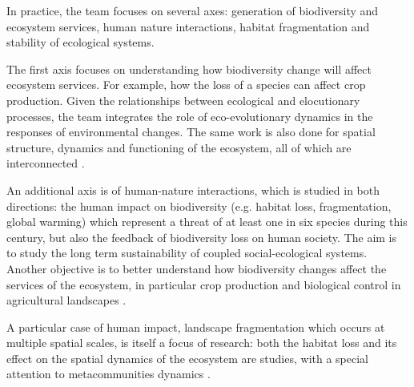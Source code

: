 \documentclass{article}
\begin{document}
In practice, the team focuses on several axes: generation of biodiversity and ecosystem services, human nature interactions, habitat fragmentation and stability of ecological systems.

The first axis focuses on understanding how biodiversity change will affect ecosystem services. For example, how the loss of a species can affect crop production. Given the relationships between ecological and elocutionary processes, the team integrates the role of eco-evolutionary dynamics in the responses of environmental changes. The same work is also done for spatial structure, dynamics and functioning of the ecosystem, all of which are interconnected \citep{bastazini_loss_2017, bideault_temperature_2019, galiana_geographical_2019}.

An additional axis is of human-nature interactions, which is studied in both directions: the human impact on biodiversity (e.g. habitat loss, fragmentation, global warming) which represent a threat of at least one in six species during this century, but also the feedback of biodiversity loss on human society. The aim is to study the long term sustainability of coupled social-ecological systems. Another objective is to better understand how biodiversity changes affect the services of the ecosystem, in particular crop production and biological control in agricultural landscapes \citep{cazalis_we_2018, lafuite_sustainable_2018, montoya_trade-offs_2018, montoya_tradeoffs_2019}.

A particular case of human impact, landscape fragmentation which occurs at multiple spatial scales, is itself a focus of research: both the habitat loss and its effect on the spatial dynamics of the ecosystem are studies, with a special attention to metacommunities dynamics \citep{goncalves_habitat_2018, jacobi_operationalizing_2018}.
\end{document}
